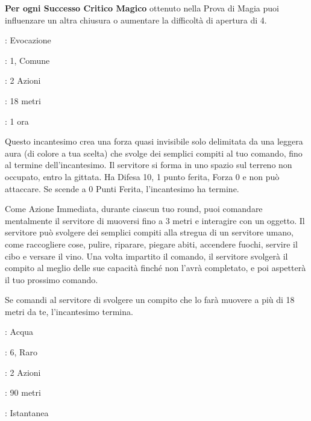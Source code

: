 \begin{multicols}{2}
\textbf{Per ogni Successo Critico Magico} ottenuto nella Prova di Magia puoi influenzare un altra chiusura o aumentare la difficoltà di apertura di 4.

\noindent\colorbox{OBSSgold!10}{
\begin{minipage}{0.95\linewidth}
\begin{description}[noitemsep, topsep=0pt, parsep=0pt, partopsep=0pt, leftmargin=0cm, labelwidth=1.3cm]
	\item[\textbf{Lista}]: Evocazione
	\item[\textbf{Livello}]: 1, Comune
	\item[\textbf{Lancio}]: 2 Azioni
	\item[\textbf{Gittata}]: 18 metri
	\item[\textbf{Durata}]: 1 ora
\end{description}
\end{minipage}}\smallskip

Questo incantesimo crea una forza quasi invisibile solo delimitata da una leggera aura (di colore a tua scelta) che svolge dei semplici compiti al tuo comando, fino al termine dell'incantesimo. Il servitore si forma in uno spazio sul terreno non occupato, entro la gittata. Ha Difesa 10, 1 punto ferita, Forza 0 e non può attaccare. Se scende a 0 Punti Ferita, l'incantesimo ha termine.

Come Azione Immediata, durante ciascun tuo round, puoi comandare mentalmente il servitore di muoversi fino a 3 metri e interagire con un oggetto. Il servitore può svolgere dei semplici compiti alla stregua di un servitore umano, come raccogliere cose, pulire, riparare, piegare abiti, accendere fuochi, servire il cibo e versare il vino. Una volta impartito il comando, il servitore svolgerà il compito al meglio delle sue capacità finché non l'avrà completato, e poi aspetterà il tuo prossimo comando.

Se comandi al servitore di svolgere un compito che lo farà muovere a più di 18 metri da te, l'incantesimo termina.

\noindent\colorbox{OBSSgold!10}{
\begin{minipage}{0.95\linewidth}
\begin{description}[noitemsep, topsep=0pt, parsep=0pt, partopsep=0pt, leftmargin=0cm, labelwidth=1.3cm]
	\item[\textbf{Lista}]: Acqua
	\item[\textbf{Livello}]: 6, Raro
	\item[\textbf{Lancio}]: 2 Azioni
	\item[\textbf{Gittata}]: 90 metri
	\item[\textbf{Durata}]: Istantanea
\end{description}
\end{minipage}}\smallskip


\end{multicols}
